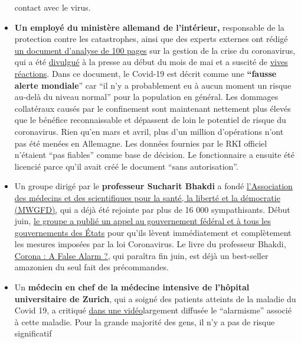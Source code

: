 \begin{itemize}
  contact avec le virus.
\item
  \textbf{Un employé du ministère allemand de l'intérieur,} responsable
  de la protection contre les catastrophes, ainsi que des experts
  externes ont rédigé
  \href{https://www.ichbinanderermeinung.de/Dokument93.pdf}{un document
  d'analyse de 100 pages} sur la gestion de la crise du coronavirus, qui
  a été
  \href{https://www.ichbinanderermeinung.de/Dokument93.pdf}{divulgué} à
  la presse au début du mois de mai et a suscité de
  \href{https://www.zeit.de/politik/deutschland/2020-05/corona-pandemie-bekaempfung-massnahmen-innenministerium-verschwoerungstheorien-regierungsrat/komplettansicht}{vives
  réactions}. Dans ce document, le Covid-19 est décrit comme une
  \textbf{``fausse alerte mondiale}'' car ``il n'y a probablement eu à
  aucun moment un risque au-delà du niveau normal'' pour la population
  en général. Les dommages collatéraux causés par le confinement sont
  maintenant nettement plus élevés que le bénéfice reconnaissable et
  dépassent de loin le potentiel de risque du coronavirus. Rien qu'en
  mars et avril, plus d'un million d'opérations n'ont pas été menées en
  Allemagne. Les données fournies par le RKI officiel n'étaient ``pas
  fiables'' comme base de décision. Le fonctionnaire a ensuite été
  licencié parce qu'il avait créé le document ``sans autorisation''.
\item
  Un groupe dirigé par le \textbf{professeur Sucharit Bhakdi} a fondé
  \href{https://www.mwgfd.de/}{l'Association des médecins et des
  scientifiques pour la santé, la liberté et la démocratie (MWGFD),} qui
  a déjà été rejointe par plus de 16 000 sympathisants. Début juin,
  \href{https://www.mwgfd.de/category/topaktuell/}{le groupe a publié un
  appel au gouvernement fédéral et à tous les gouvernements des États}
  pour qu'ils lèvent immédiatement et complètement les mesures imposées
  par la loi Coronavirus. Le livre du professeur Bhakdi,
  \href{https://www.amazon.de/Corona-Fehlalarm-Daten-Fakten-Hintergr\%25C3\%25BCnde/dp/3990601911}{Corona
  : A False Alarm ?,} qui paraîtra fin juin, est déjà un best-seller
  amazonien du seul fait des précommandes.
\item
  Un \textbf{médecin en chef de la médecine intensive de l'hôpital
  universitaire de Zurich}, qui a soigné des patients atteints de la
  maladie du Covid 19, a critiqué
  \href{https://www.medinside.ch/de/post/corona-intensivmediziner-spricht-klartext}{dans
  une vidéo}largement diffusée le ``alarmisme'' associé à cette maladie.
  Pour la grande majorité des gens, il n'y a pas de risque significatif

\end{itemize}
